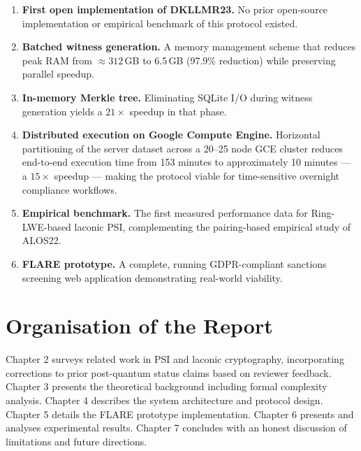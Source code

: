 \begin{enumerate}
    \item \textbf{First open implementation of DKLLMR23.} No prior open-source
          implementation or empirical benchmark of this protocol existed.
    \item \textbf{Batched witness generation.} A memory management scheme that
          reduces peak RAM from $\approx 312$\,GB to 6.5\,GB (97.9\% reduction)
          while preserving parallel speedup.
    \item \textbf{In-memory Merkle tree.} Eliminating SQLite I/O during witness
          generation yields a $21\times$ speedup in that phase.
    \item \textbf{Distributed execution on Google Compute Engine.} Horizontal
          partitioning of the server dataset across a 20--25 node GCE cluster
          reduces end-to-end execution time from 153 minutes to approximately 10
          minutes --- a $15\times$ speedup --- making the protocol viable for
          time-sensitive overnight compliance workflows.
    \item \textbf{Empirical benchmark.} The first measured performance data for
          Ring-LWE-based laconic PSI, complementing the pairing-based empirical
          study of ALOS22.
    \item \textbf{FLARE prototype.} A complete, running GDPR-compliant sanctions
          screening web application demonstrating real-world viability.
\end{enumerate}

\section{Organisation of the Report}

Chapter 2 surveys related work in PSI and laconic cryptography, incorporating
corrections to prior post-quantum status claims based on reviewer feedback.
Chapter 3 presents the theoretical background including formal complexity analysis.
Chapter 4 describes the system architecture and protocol design.
Chapter 5 details the FLARE prototype implementation.
Chapter 6 presents and analyses experimental results.
Chapter 7 concludes with an honest discussion of limitations and future directions.

\clearpage
